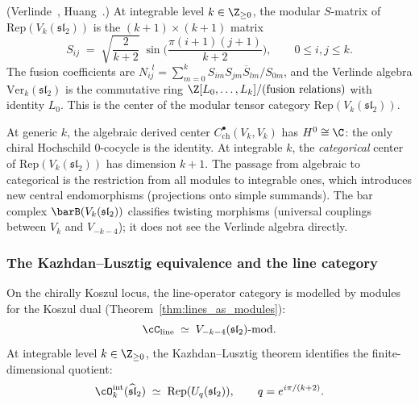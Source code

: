 \begin{proposition}
\label{prop:benchmark-verlinde}
\textup{(Verlinde~\cite{Verlinde1988},
Huang~\cite{Huang2005}.)}
At integrable level $k \in \Z_{\ge 0}$, the modular $S$-matrix of
$\mathrm{Rep}(V_k(\mathfrak{sl}_2))$ is the
$(k{+}1) \times (k{+}1)$ matrix
\begin{equation}\label{eq:benchmark-s-matrix}
 S_{ij}
 \;=\;
 \sqrt{\frac{2}{k+2}}\;
 \sin\!\biggl(\frac{\pi(i+1)(j+1)}{k+2}\biggr),
 \qquad
 0 \le i, j \le k.
\end{equation}
The fusion coefficients are $N_{ij}^{\;\;l}
= \sum_{m=0}^k S_{im} S_{jm} \overline{S}_{lm} / S_{0m}$,
and the Verlinde algebra $\mathrm{Ver}_{k}(\mathfrak{sl}_2)$ is
the commutative ring $\Z[L_0, \ldots, L_k] / (\text{fusion
relations})$ with identity $L_0$. This is the center of the
modular tensor category
$\mathrm{Rep}(V_k(\mathfrak{sl}_2))$.
\end{proposition}

\begin{remark}
\label{rem:benchmark-generic-vs-integrable}
At generic $k$, the algebraic derived center $C^\bullet_{\mathrm{ch}}(V_k, V_k)$ has
$H^0 \cong \C$: the only chiral Hochschild $0$-cocycle is the identity.
At integrable $k$, the \emph{categorical} center of
$\mathrm{Rep}(V_k(\mathfrak{sl}_2))$ has dimension $k+1$.
The passage from algebraic to categorical is the restriction from
all modules to integrable ones, which introduces new central
endomorphisms (projections onto simple summands). The bar complex
$\barB(V_k(\mathfrak{sl}_2))$ classifies twisting morphisms
(universal couplings between $V_k$ and $V_{-k-4}$); it does not
see the Verlinde algebra directly.
\end{remark}


\subsubsection{The Kazhdan--Lusztig equivalence and the line category}
\label{subsubsec:benchmark-kl-category}

On the chirally Koszul locus, the line-operator category is
modelled by modules for the Koszul dual
(Theorem~\ref{thm:lines_as_modules}):
\begin{equation}\label{eq:benchmark-line-category}
 \cC_{\mathrm{line}}
 \;\simeq\;
 V_{-k-4}(\mathfrak{sl}_2)\text{-mod}.
\end{equation}
At integrable level $k \in \Z_{\ge 0}$, the Kazhdan--Lusztig
theorem identifies the finite-dimensional quotient:
\begin{equation}\label{eq:benchmark-kl-equivalence}
 \cO_k^{\mathrm{int}}(\widehat{\mathfrak{sl}}_2)
 \;\simeq\;
 \mathrm{Rep}(U_q(\mathfrak{sl}_2)),
 \qquad
 q = e^{i\pi/(k+2)}.
\end{equation}

